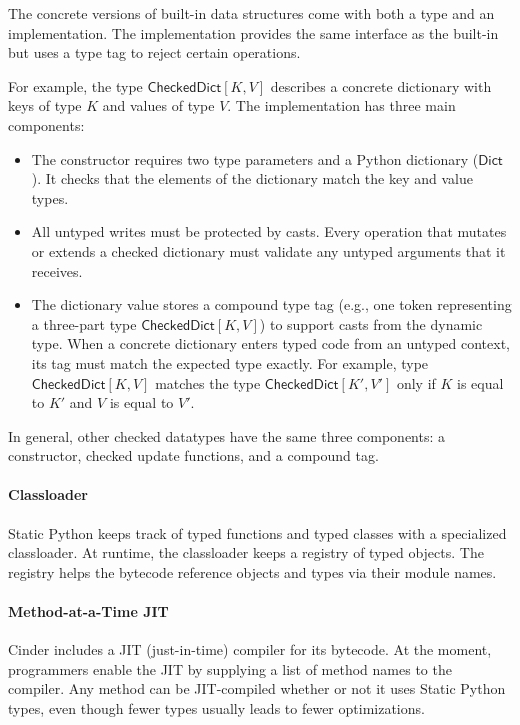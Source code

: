 \documentclass[english,cleveref,submission]{programming}
\newcommand{\SP}{Static Python}
\newcommand{\typefont}[1]{\mathsf{#1}}
\newcommand{\paramtype}[2]{#1[#2]}
\newcommand{\sptrawpydict}{\typefont{Dict}}
\newcommand{\sptrawchkdict}{\typefont{CheckedDict}} %
\newcommand{\sptchkdict}[2]{\paramtype{\sptrawchkdict}{#1, #2}}
\begin{document}
The concrete versions of built-in data structures come with both a type and an
implementation.
The implementation provides the same interface as the built-in but uses a
type tag to reject certain operations.

For example, the type $\sptchkdict{K}{V}$ describes a concrete dictionary
with keys of type $K$ and values of type $V$.
The implementation has three main components:
\begin{itemize}
  \item
    The constructor requires two type parameters and a Python dictionary ($\sptrawpydict$).
    It checks that the elements of the dictionary match the key and value types.
  \item
    All untyped writes must be protected by casts.
    Every operation that mutates or extends a checked dictionary must
    validate any untyped arguments that it receives.
  \item
    The dictionary value stores a compound type tag 
    (e.g., one token representing a three-part type $\sptchkdict{K}{V}$)
    to support casts from the dynamic type.
    When a concrete dictionary enters typed code from an untyped context,
    its tag must match the expected type exactly.
    For example, type $\sptchkdict{K}{V}$ matches the type
    $\sptchkdict{K'}{V'}$ only if $K$ is equal to $K'$
    and $V$ is equal to $V'$.
\end{itemize}
%
In general, other checked datatypes have the same three components:
a constructor, checked update functions, and a compound tag.


\paragraph{Classloader}
\label{s:classloader}

\SP{} keeps track of typed functions and typed classes with a specialized classloader.
At runtime, the classloader keeps a registry of typed objects.
The registry helps the bytecode reference objects and types via their module names.


\paragraph{Method-at-a-Time JIT}
\label{s:jit}

Cinder includes a JIT (just-in-time) compiler for its bytecode.
At the moment, programmers enable the JIT by supplying a list of method names
to the compiler.
Any method can be JIT-compiled whether or not it uses \SP{} types,
even though fewer types usually leads to fewer optimizations.
\end{document}
